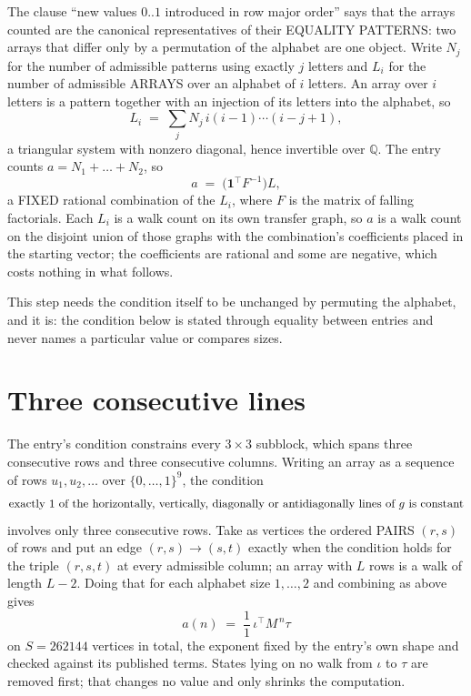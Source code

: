\documentclass[11pt,a4paper]{article}
\theoremstyle{plain}
\theoremstyle{definition}
\begin{document}
The clause ``new values $0..1$ introduced in row major order'' says that the arrays
counted are the canonical representatives of their EQUALITY PATTERNS: two arrays that differ
only by a permutation of the alphabet are one object. Write $N_j$ for the number of admissible
patterns using exactly $j$ letters and $L_i$ for the number of admissible ARRAYS over an
alphabet of $i$ letters. An array over $i$ letters is a pattern together with an injection of
its letters into the alphabet, so
\[
L_i\;=\;\sum_{j}N_j\,i(i-1)\cdots(i-j+1),
\]
a triangular system with nonzero diagonal, hence invertible over $\mathbb{Q}$. The entry
counts $a=N_1+\dots+N_{2}$, so
\[
a\;=\;\bigl(\mathbf{1}^{\!\top}F^{-1}\bigr)L ,
\]
a FIXED rational combination of the $L_i$, where $F$ is the matrix of falling factorials.
Each $L_i$ is a walk count on its own transfer graph, so $a$ is a walk count on the disjoint
union of those graphs with the combination's coefficients placed in the starting vector; the
coefficients are rational and some are negative, which costs nothing in what follows.

This step needs the condition itself to be unchanged by permuting the alphabet, and it is:
the condition below is stated through equality between entries and never names a particular
value or compares sizes.

\section{Three consecutive lines}

The entry's condition constrains every $3\times3$ subblock, which spans three consecutive
rows and three consecutive columns. Writing an array as a sequence of rows
$u_1,u_2,\dots$ over $\{0,\dots,1\}^{9}$, the condition
\[
\text{exactly }1\text{ of the horizontally, vertically, diagonally or antidiagonally lines of }g\text{ \text{is constant}}
\]
involves only three consecutive rows. Take as vertices the ordered PAIRS $(r,s)$ of
rows and put an edge $(r,s)\to(s,t)$ exactly when the condition holds for the triple
$(r,s,t)$ at every admissible column; an array with $L$ rows is a walk of length $L-2$.
Doing that for each alphabet size $1,\dots,2$ and combining as above gives
\[
a(n)\;=\;\frac{1}{1}\,\iota^{\!\top}M^{\,n}\tau
\]
on $S=262144$ vertices in total, the exponent fixed by the entry's own shape and checked against
its published terms. States lying on no walk from $\iota$ to $\tau$ are removed first; that
changes no value and only shrinks the computation.
\end{document}
